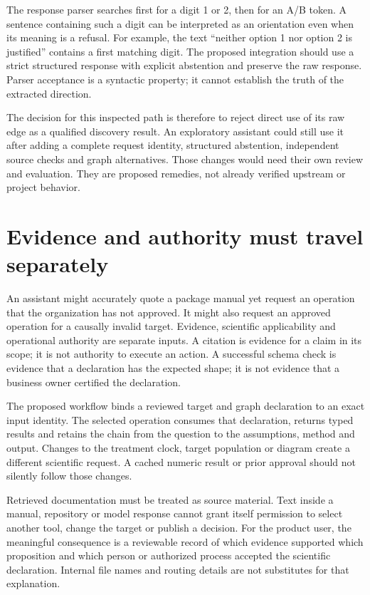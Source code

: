 The response parser searches first for a digit 1 or 2, then for an A/B token.
A sentence containing such a digit can be interpreted as an orientation even
when its meaning is a refusal. For example, the text ``neither option 1 nor
option 2 is justified'' contains a first matching digit. The proposed
integration should use a strict structured response with explicit abstention
and preserve the raw response. Parser acceptance is a syntactic property;
it cannot establish the truth of the extracted direction.

The decision for this inspected path is therefore to reject direct use of its
raw edge as a qualified discovery result. An exploratory assistant could still
use it after adding a complete request identity, structured abstention,
independent source checks and graph alternatives. Those changes would need
their own review and evaluation. They are proposed remedies, not already
verified upstream or project behavior.

\section{Evidence and authority must travel separately}

An assistant might accurately quote a package manual yet request an operation
that the organization has not approved. It might also request an approved
operation for a causally invalid target. Evidence, scientific applicability
and operational authority are separate inputs. A citation is evidence for a
claim in its scope; it is not authority to execute an action. A successful
schema check is evidence that a declaration has the expected shape; it is not
evidence that a business owner certified the declaration.

The proposed workflow binds a reviewed target and graph declaration to an
exact input identity. The selected operation consumes that declaration,
returns typed results and retains the chain from the question to the
assumptions, method and output. Changes to the treatment clock, target
population or diagram create a different scientific request. A cached
numeric result or prior approval should not silently follow those changes.

Retrieved documentation must be treated as source material. Text inside a
manual, repository or model response cannot grant itself permission to select
another tool, change the target or publish a decision. For the product user,
the meaningful consequence is a reviewable record of which evidence supported
which proposition and which person or authorized process accepted the
scientific declaration. Internal file names and routing details are not
substitutes for that explanation.

